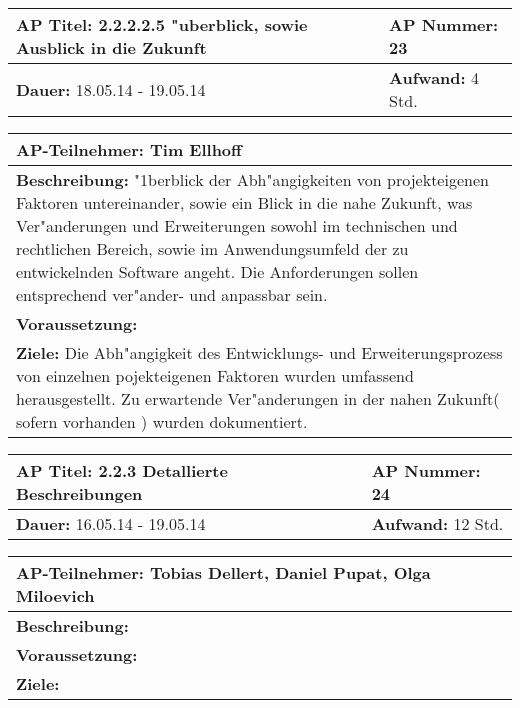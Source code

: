 \begin{tabular}{|p{7.43cm}|p{7.43cm}|}
\hline
\textbf{AP Titel: }2.2.2.2.5 "uberblick, sowie Ausblick in die Zukunft& \textbf{AP Nummer: }23\\ 
\hline
\textbf{Dauer: }18.05.14 - 19.05.14& \textbf{Aufwand: } 4 Std.\\
\hline
\end{tabular}
\begin{tabular}{|p{15.3cm}|}
\hline
\textbf{AP-Teilnehmer: }Tim Ellhoff\\
\hline
\textbf{Beschreibung: }"1berblick der Abh"angigkeiten von projekteigenen Faktoren untereinander, sowie ein Blick in die nahe Zukunft, was Ver"anderungen und Erweiterungen sowohl im technischen und rechtlichen Bereich, sowie im Anwendungsumfeld der zu entwickelnden Software angeht. Die Anforderungen sollen entsprechend ver"ander-
 und anpassbar sein.\\
\hline
\textbf{Voraussetzung: }\\
\hline 
\textbf{Ziele: }Die Abh"angigkeit des Entwicklungs- und Erweiterungsprozess von einzelnen pojekteigenen Faktoren wurden umfassend herausgestellt. Zu erwartende Ver"anderungen in der nahen Zukunft( sofern vorhanden ) wurden dokumentiert.\\
\hline 
\end{tabular}

\begin{tabular}{|p{7.43cm}|p{7.43cm}|}
\hline
\textbf{AP Titel: }2.2.3 Detallierte Beschreibungen & \textbf{AP Nummer: }24\\ 
\hline
\textbf{Dauer: }16.05.14 - 19.05.14& \textbf{Aufwand: } 12 Std.\\
\hline
\end{tabular}
\begin{tabular}{|p{15.3cm}|}
\hline
\textbf{AP-Teilnehmer: }Tobias Dellert, Daniel Pupat, Olga Miloevich\\
\hline
\textbf{Beschreibung: }\\
\hline
\textbf{Voraussetzung: }\\
\hline 
\textbf{Ziele: }\\
\hline 
\end{tabular}

